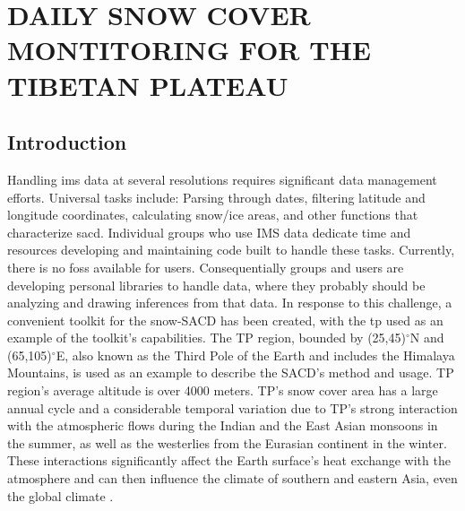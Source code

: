 \chapter{DAILY SNOW COVER MONTITORING FOR THE TIBETAN PLATEAU}
\label{chap:tibet}

\section{Introduction}

Handling \acrfull{ims} data at several resolutions requires significant data management efforts. Universal tasks include: Parsing through dates, filtering latitude and longitude coordinates, calculating snow/ice areas, and other functions that characterize \acrfull{sacd}. Individual groups who use IMS data dedicate time and resources developing and maintaining code built to handle these tasks. Currently, there is no \acrfull{foss} available for users. Consequentially groups and users are developing personal libraries to handle data, where they probably should be analyzing and drawing inferences from that data. In response to this challenge, a convenient toolkit for the snow-SACD has been created, with the \acrfull{tp} used as an example of the toolkit's capabilities.
The TP region, bounded by (25,45)$^\circ$N and (65,105)$^\circ$E, also known as the Third Pole of the Earth and includes the Himalaya Mountains, is used as an example to describe the 
SACD's method and usage.
TP region's average altitude is over 4000 meters. TP's snow cover area has a large annual cycle and a considerable temporal variation due to TP's strong interaction with the atmospheric flows during the Indian and the East Asian monsoons in the summer, as well as the westerlies from the Eurasian continent in the winter.  These interactions significantly affect the Earth surface's heat exchange with the atmosphere and can then influence the climate of southern and eastern Asia, even the global climate \cite{yao2012different, yao2013review}. 
